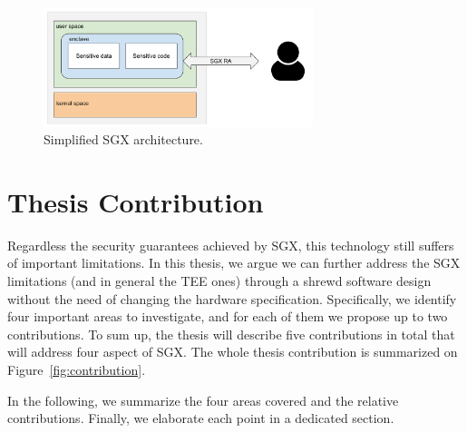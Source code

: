 \begin{figure}[t]
	\centering
	\includegraphics[width=0.7\textwidth]{fig_c1/sgx-architecture.pdf}
	\caption[SGX architecture.]{Simplified SGX architecture.}
	\label{fig:sgx-architecture}
\end{figure}

\section{Thesis Contribution}

Regardless the security guarantees achieved by SGX, this technology still 
suffers of important limitations.
In this thesis, we argue we can further address the SGX limitations (and in 
general the TEE ones) through a shrewd software design without the need of 
changing the hardware specification.
Specifically, we identify four important areas to investigate, and for each of 
them we propose up to two contributions.
To sum up, the thesis will describe five contributions in total that will 
address four aspect of SGX. The whole thesis contribution is summarized on 
Figure~\ref{fig:contribution}.

In the following, we summarize the four areas covered and the relative 
contributions. Finally, we elaborate each point in a dedicated section.

